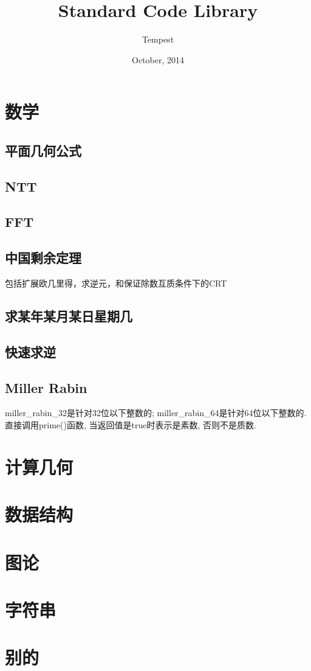 \documentclass[a4paper,10pt]{book}
\title{\LARGE{Standard Code Library}}
\author{Tempest}
\date{October, 2014}
\begin{document}
\maketitle

\tableofcontents

\newpage

\chapter{数学}
	\section{平面几何公式}
		
	\section{NTT}
		
	\section{FFT}
			
	\section{中国剩余定理}
		包括扩展欧几里得，求逆元，和保证除数互质条件下的CRT
		
	\section{求某年某月某日星期几}
		
	\section{快速求逆}
		
	\section{Miller Rabin}	
		miller\_rabin\_32是针对32位以下整数的; miller\_rabin\_64是针对64位以下整数的.
		直接调用prime()函数, 当返回值是true时表示是素数, 否则不是质数.
		
\chapter{计算几何}
\chapter{数据结构}
\chapter{图论}
\chapter{字符串}
\chapter{别的}
\end{document}

